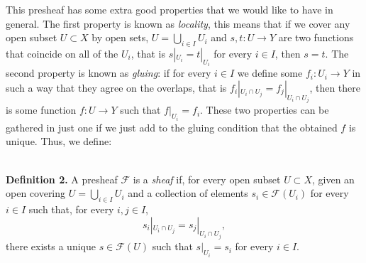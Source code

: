   This presheaf has some extra good properties that we would like to have in general. The first property is known as \emph{locality}, this means that if we cover any open subset $U\subset X$ by open sets, $U=\bigcup_{i\in I} U_i$ and $s,t: U \rightarrow Y$ are two functions that coincide on all of the $U_i$, that is $s|_{U_i}=t|_{U_i}$ for every $i\in I$, then $s=t$. The second property is known as \emph{gluing}: if for every $i \in I$ we define some $f_i:U_i \rightarrow Y$ in such a way that they agree on the overlaps, that is $f_i|_{U_i\cap U_j} = f_j|_{U_i \cap U_j}$, then there is some function $f:U \rightarrow Y$ such that $f|_{U_i} =f_i$. These two properties can be gathered in just one if we just add to the gluing condition that the obtained $f$ is unique. Thus, we define:

  \ \\
  \textbf{Definition 2.} A presheaf $\mathcal{F}$ is a \emph{sheaf} if, for every open subset $U\subset X$, given an open covering $U=\bigcup_{i\in I} U_i$ and a collection of elements $s_i \in \mathcal{F}(U_i)$ for every $i\in I$ such that, for every $i,j \in I$, 
  \begin{equation*}
    s_i|_{U_i \cap U_j} = s_j|_{U_i \cap U_j},
  \end{equation*}
  there exists a unique $s\in \mathcal{F}(U)$ such that $s|_{U_i}=s_i$ for every $i\in I$.     \\

